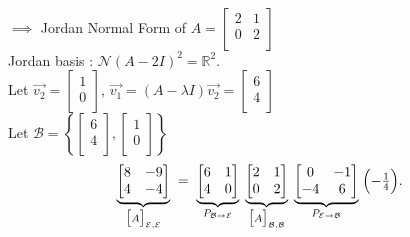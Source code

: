 \documentclass{report}
\begin{document}
{   \\
   $ \implies$ Jordan Normal Form of $ A = \begin{bmatrix}
   2 & 1\\
   0 & 2\\
   \end{bmatrix}$\\
   Jordan basis : $ \mathcal{N} \left(  A - 2I \right) ^2 = \mathbb{R} ^2$.\\
   Let $ \vec{ v_2} = \begin{bmatrix}
   1\\
   0\\
   \end{bmatrix}
    $, $ \vec{ v_1} = \left( A - \lambda I \right) \vec{ v_2} = \begin{bmatrix}
    6\\
    4\\
    \end{bmatrix}
     $             \\
     Let $ \mathcal{B} = \left\{ \begin{bmatrix}
     6\\
     4\\
     \end{bmatrix}
     , \begin{bmatrix}
     1\\
     0\\
     \end{bmatrix}
      \right\} $ \\
      \[
\underbrace{\begin{bmatrix}
  8 & -9\\
  4 & -4
\end{bmatrix}}_{\mathclap{\bigl[A\bigr]_{\mathcal E,\mathcal E}}}
\;=\;
\underbrace{\begin{bmatrix}
  6 &  1\\
  4 &  0
\end{bmatrix}}_{\mathclap{P_{\mathcal B\to\mathcal E}}}
\;
\underbrace{\begin{bmatrix}
  2 & 1\\
  0 & 2
\end{bmatrix}}_{\mathclap{\bigl[A\bigr]_{\mathcal B,\mathcal B}}}
\;
\underbrace{\begin{bmatrix}
  0 & -1\\
 -4 &  6
\end{bmatrix}}_{\mathclap{P_{\mathcal E\to\mathcal B}}}
\;\Bigl(-\tfrac14\Bigr).
\]

}
\end{document}
